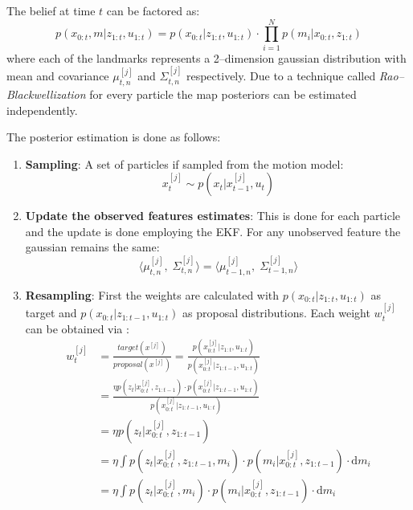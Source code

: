 The belief at time $t$ can be factored as:
\begin{equation}
  p(x_{0:t},m|z_{1:t},u_{1:t}) = p(x_{0:t}|z_{1:t},u_{1:t})\cdot \prod\limits_{i=1}^{N}p(m_i|x_{0:t}, z_{1:t})
  \label{eq:rao}
\end{equation}  
where each of the landmarks represents a 2--dimension gaussian distribution with mean and covariance $\mu_{t,n}^{[j]}$ and $\Sigma_{t,n}^{[j]}$ respectively. Due to a technique called \emph{Rao--Blackwellization} for every particle the map posteriors can be estimated independently.

The posterior estimation is done as follows:
\begin{enumerate}
  \item \textbf{Sampling}: A set of particles if sampled from the motion model:
  \begin{equation}
    x_t^{[j]} \sim p(x_t|x_{t-1}^{[j]},u_t)
    \label{eq:slamsamplemotion}
  \end{equation}  

  \item \textbf{Update the observed features estimates}: This is done for each particle and the update is done employing the EKF. For any unobserved feature the gaussian remains the same:
  \begin{equation}
    \langle \mu_{t,n}^{[j]},\; \Sigma_{t,n}^{[j]}\rangle = \langle \mu_{t-1,n}^{[j]},\; \Sigma_{t-1,n}^{[j]}\rangle
    \label{eq:simpleupdate}
  \end{equation}  

  \item \textbf{Resampling}: First the weights are calculated with $p(x_{0:t}|z_{1:t},u_{1:t})$ as target and $p(x_{0:t}|z_{1:t-1},u_{1:t})$ as proposal distributions. Each weight $w_t^{[j]}$ can be obtained via :
  \begin{equation}
    \begin{split}
    w_t^{[j]} & = \frac{target(x^{[j]})}{proposal(x^{[j]})} = \frac{p(x^{[j]}_{0:t}|z_{1:t},u_{1:t})}{p(x^{[j]}_{0:t}|z_{1:t-1},u_{1:t})}\\
              & = \frac{\eta p(z_t|x^{[j]}_{0:t},z_{1:t-1})\cdot p(x^{[j]}_{0:t}|z_{1:t-1},u_{1:t})}{p(x^{[j]}_{0:t}|z_{1:t-1},u_{1:t})} \\
              & = \eta p(z_t|x^{[j]}_{0:t},z_{1:t-1}) \\
              & = \eta\!\int\!  p(z_t|x^{[j]}_{0:t},z_{1:t-1},m_i)\cdot p(m_i|x^{[j]}_{0:t},z_{1:t-1})\cdot \mathrm{d}m_i \\
              & = \eta\!\int\!  p(z_t|x^{[j]}_{0:t},m_i)\cdot p(m_i|x^{[j]}_{0:t},z_{1:t-1})\cdot \mathrm{d}m_i
    \end{split}
  \end{equation}
\end{enumerate}  

